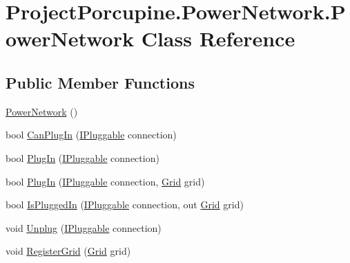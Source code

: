 \hypertarget{class_project_porcupine_1_1_power_network_1_1_power_network}{}\section{Project\+Porcupine.\+Power\+Network.\+Power\+Network Class Reference}
\label{class_project_porcupine_1_1_power_network_1_1_power_network}
\subsection*{Public Member Functions}
\begin{DoxyCompactItemize}
\item 
\hyperlink{class_project_porcupine_1_1_power_network_1_1_power_network_a35fdfc8457ae75272661a36ddd65c4e4}{Power\+Network} ()
\item 
bool \hyperlink{class_project_porcupine_1_1_power_network_1_1_power_network_ad60994ccbf3ac5312da6fdab5eaa6733}{Can\+Plug\+In} (\hyperlink{interface_project_porcupine_1_1_power_network_1_1_i_pluggable}{I\+Pluggable} connection)
\item 
bool \hyperlink{class_project_porcupine_1_1_power_network_1_1_power_network_ab6ca33ff4075cd8754bb7597454a9b5c}{Plug\+In} (\hyperlink{interface_project_porcupine_1_1_power_network_1_1_i_pluggable}{I\+Pluggable} connection)
\item 
bool \hyperlink{class_project_porcupine_1_1_power_network_1_1_power_network_a95477cc53da485b6afc4243ae9313d6c}{Plug\+In} (\hyperlink{interface_project_porcupine_1_1_power_network_1_1_i_pluggable}{I\+Pluggable} connection, \hyperlink{class_project_porcupine_1_1_power_network_1_1_grid}{Grid} grid)
\item 
bool \hyperlink{class_project_porcupine_1_1_power_network_1_1_power_network_a707595e584c2fba19d1f955b6a07e38f}{Is\+Plugged\+In} (\hyperlink{interface_project_porcupine_1_1_power_network_1_1_i_pluggable}{I\+Pluggable} connection, out \hyperlink{class_project_porcupine_1_1_power_network_1_1_grid}{Grid} grid)
\item 
void \hyperlink{class_project_porcupine_1_1_power_network_1_1_power_network_ae5226ecd6f3c2c1040f7d4d3be07a344}{Unplug} (\hyperlink{interface_project_porcupine_1_1_power_network_1_1_i_pluggable}{I\+Pluggable} connection)
\item 
void \hyperlink{class_project_porcupine_1_1_power_network_1_1_power_network_a62517689b35280ec24c86f1e45e7e978}{Register\+Grid} (\hyperlink{class_project_porcupine_1_1_power_network_1_1_grid}{Grid} grid)

\end{DoxyCompactItemize}
